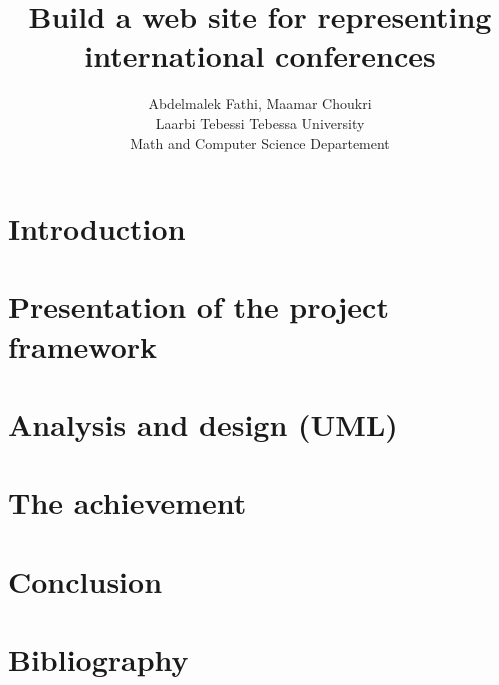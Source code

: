 \documentclass{article}
\title{Build a web site for representing international conferences}
\author{Abdelmalek Fathi, Maamar Choukri\\
Laarbi Tebessi Tebessa University\\
Math and Computer Science Departement}
\date{}
\begin{document}
	\maketitle
	\clearpage
	\tableofcontents
	\clearpage
	\section{Introduction}
	\clearpage
	\section{Presentation of the project framework}
	\clearpage
	\section{Analysis and design (UML)}
	\clearpage
	\section{The achievement}
	\clearpage
	\section{Conclusion}
	\clearpage
	\section{Bibliography}
\end{document}

